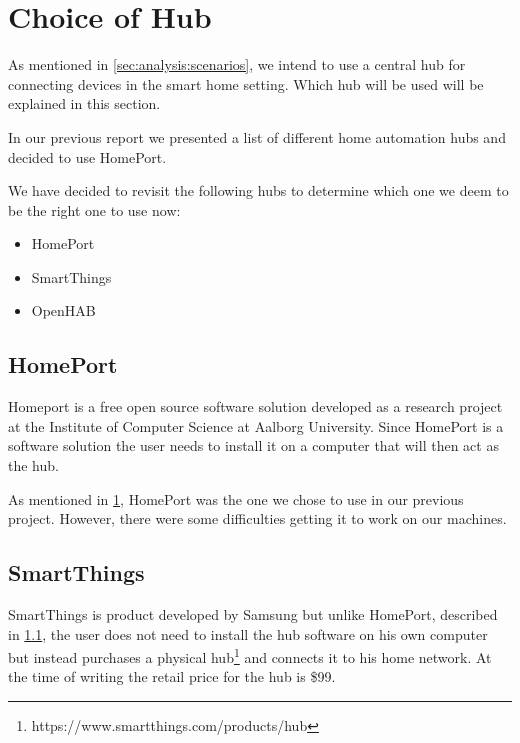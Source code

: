 \section{Choice of Hub}
\label{sec:analysis:choice-of-hub}

As mentioned in \cref{sec:analysis:scenarios}, we intend to use a central hub for connecting devices in the smart home setting. Which hub will be used will be explained in this section.

In our previous report\cite{previous-report} we presented a list of different home automation hubs and decided to use HomePort.

We have decided to revisit the following hubs to determine which one we deem to be the right one to use now:

\begin{itemize}
    \item HomePort
    \item SmartThings
    \item OpenHAB
\end{itemize}

\subsection{HomePort}
\label{sec:analysis:choice-of-hub:homeport}

Homeport\cite{HOMEPORT10,homeport:github} is a free open source software solution developed as a research project at the Institute of Computer Science at Aalborg University.
Since HomePort is a software solution the user needs to install it on a computer that will then act as the hub.

As mentioned in \cref{sec:analysis:choice-of-hub}, HomePort was the one we chose to use in our previous project. However, there were some difficulties getting it to work on our machines.

\subsection{SmartThings}
\label{sec:analysis:choice-of-hub:smartthings}

SmartThings\cite{SMARTTHINGS} is product developed by Samsung but unlike HomePort, described in \cref{sec:analysis:choice-of-hub:homeport}, the user does not need to install the hub software on his own computer but instead purchases a physical hub\footnote{https://www.smartthings.com/products/hub} and connects it to his home network.
At the time of writing the retail price for the hub is \$99.

